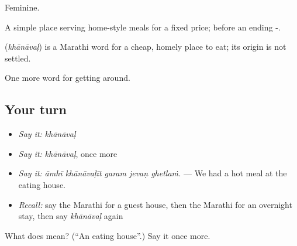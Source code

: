 Feminine.

A simple place serving home-style meals for a fixed price; before an ending -.

\begin{cousinweb}
\textbf{} (\emph{khānāvaḷ}) is a Marathi word for a cheap, homely place to eat; its origin is not settled.
\end{cousinweb}

\begin{grammarlens}[title={What you've built}]
One more word for getting around.
\end{grammarlens}

\subsection*{Your turn}
\begin{itemize}
\raggedright
  \item \emph{Say it:} \emph{khānāvaḷ}
  \item \emph{Say it:} \emph{khānāvaḷ}, once more
  \item \emph{Say it:} \emph{āmhī khānāvaḷīt garam jevaṇ ghetlaṁ.} — We had a hot meal at the eating house.
  \item \emph{Recall:} say the Marathi for a guest house, then the Marathi for an overnight stay, then say \emph{khānāvaḷ} again
\end{itemize}

\begin{tcolorbox}[breakable,colback=teal!4,colframe=teal!35!black,title={Before you move on}]
What does  mean? (\textquotedblleft{}An eating house\textquotedblright{}.) Say it once more.
\end{tcolorbox}
